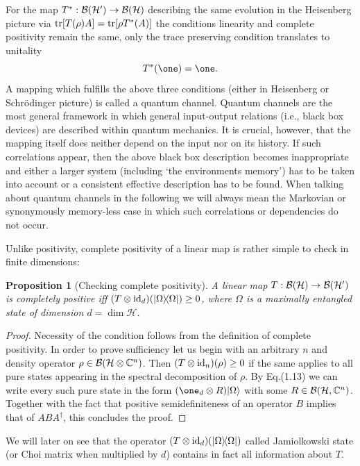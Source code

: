 \documentclass[11pt,a4paper]{article}
\theoremstyle{plain}
\newtheorem{proposition}{Proposition}[section]
\theoremstyle{definition}
\theoremstyle{remark}
\numberwithin{equation}{section}
\begin{document}
For the map $T^\ast:\mathcal{B}(\mathcal{H}')\to \mathcal{B}(\mathcal{H})$ describing the same evolution in the Heisenberg picture via $\operatorname{tr}[T(\rho)A]=\operatorname{tr}[\rho T^\ast(A)]$ the conditions linearity and complete positivity remain the same, only the trace preserving condition translates to unitality
\begin{equation}
    T^\ast(\one)=\one.
\end{equation}
A mapping which fulfills the above three conditions (either in Heisenberg or Schr\"odinger picture) is called a quantum channel. Quantum channels are the most general framework in which general input-output relations (i.e., black box devices) are described within quantum mechanics. It is crucial, however, that the mapping itself does neither depend on the input nor on its history. If such correlations appear, then the above black box description becomes inappropriate and either a larger system (including `the environments memory') has to be taken into account or a consistent effective description has to be found. When talking about quantum channels in the following we will always mean the Markovian or synonymously memory-less case in which such correlations or dependencies do not occur.

Unlike positivity, complete positivity of a linear map is rather simple to check in finite dimensions:

\begin{proposition}[Checking complete positivity]
    A linear map $T:\mathcal{B}(\mathcal{H})\to \mathcal{B}(\mathcal{H}')$ is completely positive iff $(T\otimes \mathrm{id}_d)(|\Omega\rangle\!\langle\Omega|)\ge 0$, where $\Omega$ is a maximally entangled state of dimension $d=\dim\mathcal{H}$.
\end{proposition}

\begin{proof}
    Necessity of the condition follows from the definition of complete positivity. In order to prove sufficiency let us begin with an arbitrary $n$ and density operator $\rho\in \mathcal{B}(\mathcal{H}\otimes \mathbb{C}^n)$. Then $(T\otimes \mathrm{id}_n)(\rho)\ge 0$ if the same applies to all pure states appearing in the spectral decomposition of $\rho$. By Eq.(1.13) we can write every such pure state in the form $(\one_d\otimes R)\ket{\Omega}$ with some $R\in \mathcal{B}(\mathcal{H},\mathbb{C}^n)$. Together with the fact that positive semidefiniteness of an operator $B$ implies that of $ABA^\dagger$, this concludes the proof.
\end{proof}

We will later on see that the operator $(T\otimes \mathrm{id}_d)(|\Omega\rangle\!\langle\Omega|)$ called Jamiolkowski state (or Choi matrix when multiplied by $d$) contains in fact all information about $T$.
\end{document}
